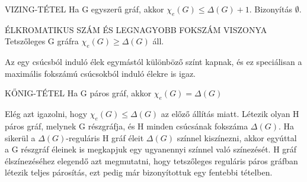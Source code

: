 \begin{tetel}{VIZING-TÉTEL}
Ha G egyszerű gráf, akkor $\chi_e(G) \leq \Delta(G) + 1$. Bizonyítás $\emptyset$.
\end{tetel}

\begin{tetel}{ÉLKROMATIKUS SZÁM ÉS LEGNAGYOBB FOKSZÁM VISZONYA}
Tetszőleges G gráfra $\chi_e(G) \geq \Delta(G)$ áll.
\end{tetel}

\begin{bizonyitas}{}
Az egy csúcsból induló élek egymástól különböző színt kapnak, és ez speciálisan a maximális fokszámú csúcsokból induló élekre is igaz.
\end{bizonyitas}

\begin{tetel}{KŐNIG-TÉTEL}
Ha G páros gráf, akkor $\chi_e(G) = \Delta(G)$
\end{tetel}

\begin{bizonyitas}{}
Elég azt igazolni, hogy $\chi_e(G) \leq \Delta(G)$ az előző állítás miatt. Létezik olyan H páros gráf, melynek G részgráfja, és H minden csúcsának fokszáma $\Delta(G)$. Ha sikerül a $\Delta(G)$-reguláris H gráf éleit $\Delta(G)$ színnel kiszínezni, akkor egyúttal a G részgráf éleinek is megkapjuk egy ugyanennyi színnel való színezését. H gráf élszínezéséhez elegendő azt megmutatni, hogy tetszőleges reguláris páros gráfban létezik teljes párosítás, ezt pedig már bizonyítottuk egy fentebbi tételben.
\end{bizonyitas}
